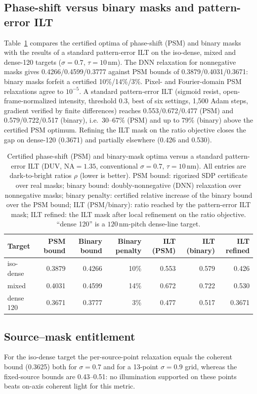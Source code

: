 \documentclass[11pt,a4paper]{article}
\newcommand{\SI}[2]{\ensuremath{#1\,\mathrm{#2}}}\newcommand{\SIrange}[3]{\ensuremath{#1\text{--}#2\,\mathrm{#3}}}
\newcommand{\NA}{\mathrm{NA}}
\begin{document}
\subsection{Phase-shift versus binary masks and pattern-error ILT}
Table~\ref{tab:psm} compares the certified optima of phase-shift (PSM) and binary masks with the results of a standard pattern-error ILT on the iso-dense, mixed and dense-120 targets ($\sigma=0.7$, $\tau=\SI{10}{nm}$). The DNN relaxation for nonnegative masks gives 0.4266/0.4599/0.3777 against PSM bounds of 0.3879/0.4031/0.3671: binary masks forfeit a certified 10\%/14\%/3\%. Pixel- and Fourier-domain PSM relaxations agree to $10^{-5}$. A standard pattern-error ILT (sigmoid resist, open-frame-normalized intensity, threshold 0.3, best of six settings, 1,500 Adam steps, gradient verified by finite differences) reaches 0.553/0.672/0.477 (PSM) and 0.579/0.722/0.517 (binary), i.e.\ 30--67\% (PSM) and up to 79\% (binary) above the certified PSM optimum. Refining the ILT mask on the ratio objective closes the gap on dense-120 (0.3671) and partially elsewhere (0.426 and 0.530).
\begin{table}[tbp]\centering\small
\caption{Certified phase-shift (PSM) and binary-mask optima versus a standard pattern-error ILT (DUV, $\NA=1.35$, conventional $\sigma=0.7$, $\tau=\SI{10}{nm}$). All entries are dark-to-bright ratios $\rho$ (lower is better). PSM bound: rigorized SDP certificate over real masks; binary bound: doubly-nonnegative (DNN) relaxation over nonnegative masks; binary penalty: certified relative increase of the binary bound over the PSM bound; ILT (PSM/binary): ratio reached by the pattern-error ILT mask; ILT refined: the ILT mask after local refinement on the ratio objective. ``dense 120'' is a \SI{120}{nm}-pitch dense-line target.}\label{tab:psm}
\begin{tabular}{@{}lrrrrrr@{}}\toprule
Target & PSM bound & Binary bound & Binary penalty & ILT (PSM) & ILT (binary) & ILT refined\\\midrule
iso-dense & 0.3879 & 0.4266 & 10\% & 0.553 & 0.579 & 0.426\\
mixed & 0.4031 & 0.4599 & 14\% & 0.672 & 0.722 & 0.530\\
dense 120 & 0.3671 & 0.3777 & 3\% & 0.477 & 0.517 & 0.3671\\
\bottomrule\end{tabular}\end{table}

\subsection{Source--mask entitlement}
For the iso-dense target the per-source-point relaxation equals the coherent bound (0.3625) both for $\sigma=0.7$ and for a 13-point $\sigma=0.9$ grid, whereas the fixed-source bounds are 0.43--0.51: no illumination supported on these points beats on-axis coherent light for this metric.
\end{document}
